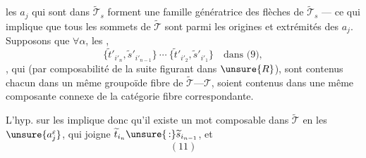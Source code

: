 les $a_j$ qui sont dans $\widetilde{\mathcal T}_s$ forment une famille génératrice des flèches de $\widetilde{\mathcal T}_s$ --- ce qui implique que tous les sommets de $\widetilde{\mathcal T}$ sont parmi  les origines et extrémités des $a_j$.
Supposons que $\forall\alpha$, les ,
\[\{\widetilde t'_{i'_n},\widetilde s'_{i'_{n-1}}\}\ \cdots\ \{\widetilde t'_{i'_2},\widetilde s'_{i'_1}\}\quad\text{dans (9)},\]
, qui (par composabilité de la suite  figurant dans $\unsure{R}$), sont contenus chacun dans un même groupoïde fibre de $\widetilde{\mathcal T}\text{---}\mathcal T$, soient contenus dans une même composante connexe de la catégorie fibre correspondante.

L'hyp. sur les  implique donc qu'il existe un mot  composable dans $\widetilde{\mathcal T}$ en les $\unsure{a_j^\varepsilon}$, qui joigne $\widetilde t_{i_n}\unsure{\,:}\widetilde s_{i_{n-1}}$, et
\[(11)\]

